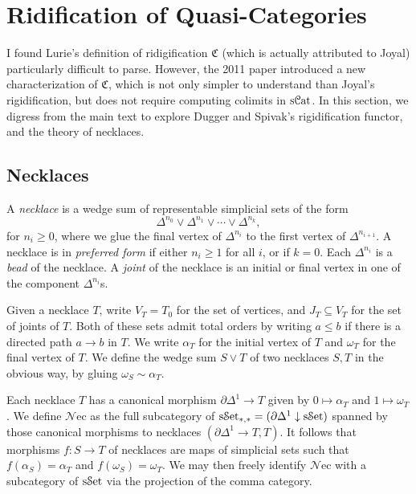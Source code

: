 \section{Ridification of Quasi-Categories}

I found Lurie's definition of ridigification $\mathfrak{C} $ (which is actually attributed to Joyal) particularly difficult to parse. However, the 2011 paper \cite{rigid} introduced a new characterization of $\mathfrak{C} $, which is not only simpler to understand than Joyal's rigidification, but does not require computing colimits in $\mathrm{s} \mathcal{C}\mathrm{at} $. In this section, we digress from the main text to explore Dugger and Spivak's rigidification functor, and the theory of necklaces.

\subsection{Necklaces}

\begin{definition}\label{1.3.1.1}
	A \emph{necklace} is a wedge sum of representable simplicial sets of the form
	\[
		\Delta ^{n_0} \vee \Delta ^{n_1} \vee \cdots \vee \Delta ^{n_k} ,
	\]
	for $n_i\geq 0$, where we glue the final vertex of $\Delta ^{n_i} $ to the first vertex of $\Delta ^{n_{i+1} } $. A necklace is in \emph{preferred form} if either $n_i \geq 1$ for all $i$, or if $k=0$. Each $\Delta ^{n_i} $ is a \emph{bead} of the necklace. A \emph{joint} of the necklace is an initial or final vertex in one of the component $\Delta ^{n_i} $s.
\end{definition}

Given a necklace $T$, write $V_T=T_0$ for the set of vertices, and $J_T\subseteq V_T$ for the set of joints of $T$. Both of these sets admit total orders by writing $a\leq b$ if there is a directed path $a\to b$ in $T$. We write $\alpha _T$ for the initial vertex of $T$ and $\omega _T$ for the final vertex of $T$. We define the wedge sum $S\vee T$ of two necklaces $S,T$ in the obvious way, by gluing $\omega _S\sim \alpha _T$.

Each necklace $T$ has a canonical morphism $\partial \Delta ^1\to T$ given by $0\mapsto \alpha _T$ and $1\mapsto \omega _T$. We define $\mathcal{N} \mathrm{ec} $ as the full subcategory of $\mathrm{s}\mathcal{S}\mathrm{et} _{*,*} =(\partial \Delta ^1\downarrow \mathrm{s}\mathcal{S}\mathrm{et} )$ spanned by those canonical morphisms to necklaces $(\partial \Delta ^1\to T,T)$. It follows that morphisms $f : S \to T$ of necklaces are maps of simplicial sets such that $f(\alpha _S)=\alpha _T$ and $f(\omega _S)=\omega _T$. We may then freely identify $\mathcal{N} \mathrm{ec} $ with a subcategory of $\mathrm{s}\mathcal{S}\mathrm{et} $ via the projection of the comma category.

